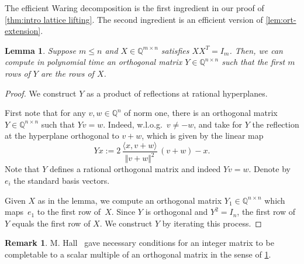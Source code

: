 \documentclass[10pt,a4paper]{article}
\newtheorem{lemma}[theorem]{Lemma}
\theoremstyle{definition}
\newtheorem{remark}[theorem]{Remark}
\newcommand{\QQ}{\mathbb{Q}}
\numberwithin{equation}{section}
\begin{document}
The efficient Waring decomposition is the first ingredient in our proof of \cref{thm:intro lattice lifting}.
The second ingredient is an efficient version of \cref{lem:ort-extension}.

\begin{lemma}\label{lem:completion-problem}
Suppose $m\leq n$ and $X\in\QQ^{m\times n}$ satisfies $X X^T = I_m$.
Then, we can compute in polynomial time an orthogonal matrix $Y\in\QQ^{n\times n}$ such that the first $m$ rows of $Y$ are the rows of $X$.
\end{lemma}

\begin{proof}
We construct $Y$ as a product of reflections at rational hyperplanes.

First note that for any $v,w\in\QQ^n$ of norm one,
there is an orthogonal matrix $Y\in\QQ^{n\times n}$
such that $Yv = w$. Indeed, w.l.o.g.\ $v\ne-w$,
and take for $Y$ the reflection at the hyperplane orthogonal to $v+w$,
which is given by the linear map
\begin{equation*}%
 Y x  := 2 \, \frac{\langle x, v+w\rangle}{\Vert v+w\Vert^2} \, (v+w)  - x .
\end{equation*}
Note that $Y$ defines a rational orthogonal matrix and indeed $Yv=w$.
Denote by $e_i$ the standard basis vectors.

Given $X$ as in the lemma,
we compute an orthogonal matrix $Y_1\in\QQ^{n\times n}$
which maps~$e_1$ to the first row of~$X$.
Since $Y$ is orthogonal and $Y^2=I_n$, the first row of $Y$ equals the first row of $X$.
We construct $Y$ by iterating this process.
\end{proof}

\begin{remark}
M. Hall~\cite{hall-completion-2,hall-completion}
gave necessary conditions for an integer matrix to be completable
to a scalar multiple of an orthogonal matrix
in the sense of \cref{lem:completion-problem}.
\end{remark}
\end{document}
